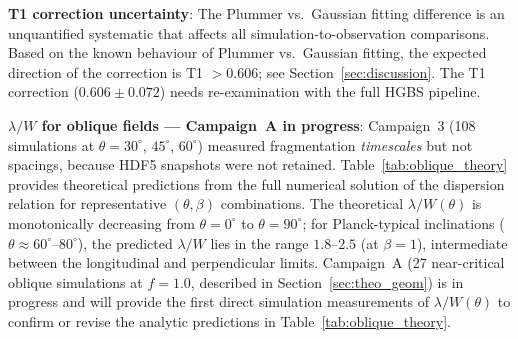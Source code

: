 \documentclass[twoside,twocolumn]{mnras}
\begin{document}
\textbf{T1 correction uncertainty}: The Plummer vs.\ Gaussian fitting difference is an unquantified systematic that affects all simulation-to-observation comparisons. Based on the known behaviour of Plummer vs.\ Gaussian fitting, the expected direction of the correction is T1 $> 0.606$; see Section~\ref{sec:discussion}. The
T1 correction ($0.606 \pm 0.072$) needs re-examination with the full HGBS pipeline.

\textbf{$\lambda/W$ for oblique fields --- Campaign~A in progress}: Campaign~3 (108 simulations at $\theta = 30^\circ$, $45^\circ$, $60^\circ$) measured fragmentation
\textit{timescales} but not spacings, because HDF5 snapshots were not retained. Table~\ref{tab:oblique_theory} provides theoretical predictions from the full numerical solution of the \citet{Nakamura1993} dispersion relation for representative $(\theta, \beta)$ combinations. The theoretical $\lambda/W(\theta)$ is monotonically decreasing from $\theta=0^\circ$ to $\theta=90^\circ$; for Planck-typical inclinations ($\theta \approx 60^\circ$--$80^\circ$), the predicted $\lambda/W$ lies in the range $1.8$--$2.5$ (at $\beta=1$), intermediate between the longitudinal and perpendicular limits. Campaign~A (27 near-critical oblique simulations at $f = 1.0$, described in Section~\ref{sec:theo_geom}) is in progress and will provide the first direct simulation measurements of $\lambda/W(\theta)$ to confirm or revise the analytic predictions in Table~\ref{tab:oblique_theory}.
\end{document}
